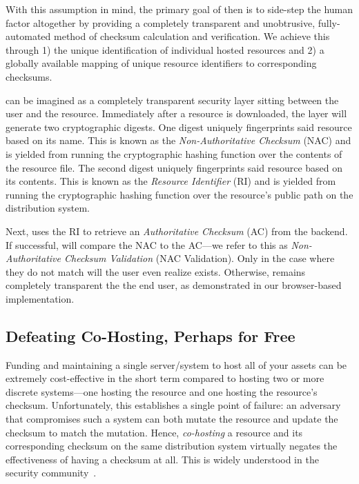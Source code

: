 With this assumption in mind, the primary goal of \SYSTEM{} then is to side-step
the human factor altogether by providing a completely transparent and
unobtrusive, fully-automated method of checksum calculation and verification. We
achieve this through 1) the unique identification of individual hosted resources
and 2) a globally available mapping of unique resource identifiers to
corresponding checksums.

\SYSTEM{} can be imagined as a completely transparent security layer sitting
between the user and the resource. Immediately after a resource is downloaded,
the \SYSTEM{} layer will generate two cryptographic digests. One digest uniquely
fingerprints said resource based on its name. This is known as the
\emph{Non-Authoritative Checksum} (NAC) and is yielded from running the
cryptographic hashing function over the contents of the resource file. The
second digest uniquely fingerprints said resource based on its contents. This is
known as the \emph{Resource Identifier} (RI) and is yielded from running the
cryptographic hashing function over the resource's public path on the
distribution system.

Next, \SYSTEM{} uses the RI to retrieve an \emph{Authoritative Checksum} (AC)
from the backend. If successful, \SYSTEM{} will compare the NAC to the AC---we
refer to this as \emph{Non-Authoritative Checksum Validation} (NAC Validation).
Only in the case where they do not match will the user even realize \SYSTEM{}
exists. Otherwise, \SYSTEM{} remains completely transparent the the end user, as
demonstrated in our browser-based implementation.


\subsection{Defeating Co-Hosting, Perhaps for Free}

Funding and maintaining a single server/system to host all of your assets can be
extremely cost-effective in the short term compared to hosting two or more
discrete systems---one hosting the resource and one hosting the resource's
checksum. Unfortunately, this establishes a single point of failure: an
adversary that compromises such a system can both mutate the resource and update
the checksum to match the mutation. Hence, \emph{co-hosting} a resource and its
corresponding checksum on the same distribution system virtually negates the
effectiveness of having a checksum at all. This is widely understood in the
security community~\cite{SCA-MINT2}.


